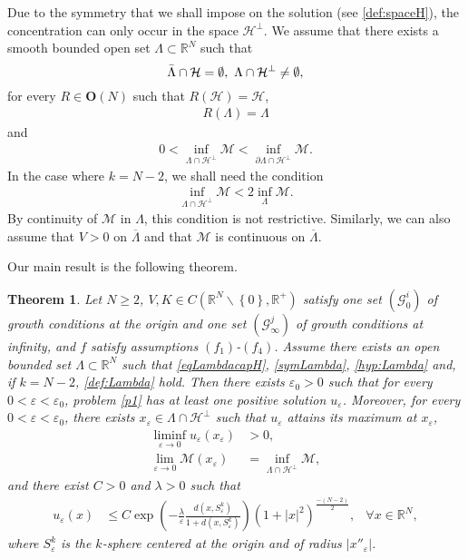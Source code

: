 \documentclass[a4paper]{amsart}
\newtheorem{theorem}{Theorem}
\begin{document}
Due to the symmetry that we shall impose on the solution (see \eqref{def:spaceH}), the
concentration can only occur in the space $\mathcal{H}^{\bot}$. We assume that there exists a smooth
bounded open set $\Lambda \subset {\mathbb{R}}^{N}$ such that  
\begin{equation}
\label{eqLambdacapH}
\Bar{\Lambda} \cap \mathcal{H} = \emptyset, \ \Lambda \cap \mathcal{H}^\perp \neq \emptyset,
\end{equation}
for every $R \in \mathbf{O}(N)$ such that $R(\mathcal{H})=\mathcal{H}$, 
\begin{align}
\label{symLambda}
  R(\Lambda)=\Lambda
\end{align}
and
\begin{align}\label{hyp:Lambda}
 0 < \inf_{\Lambda \cap \mathcal{H}^\perp}\mathcal{M} < \inf_{\partial \Lambda \cap \mathcal{H}^\perp}\mathcal{M}.
\end{align}
In the case where $k=N-2$, we shall need the condition
\begin{align}\label{def:Lambda}
 \inf_{\Lambda \cap \mathcal{H}^\perp}\mathcal{M} < 2 \inf_{\Lambda} \mathcal{M}.
\end{align}
By continuity of $\mathcal{M}$ in $\Lambda$, this condition is not restrictive.
Similarly, we can also assume that $V > 0$ on $\overline{\Lambda}$ and that $\mathcal{M}$ is continuous on $\overline{\Lambda}$.

\bigskip

Our main result is the following theorem.
\begin{theorem}\label{Th:main}
Let $N \geq 2$, $V, K \in C({\mathbb{R}}^N \backslash \left\{ 0 \right\},{\mathbb{R}}^+)$ satisfy one set $(\mathcal{G}_{0}^i)$ of growth conditions
at the origin and one set $(\mathcal{G}_{\infty}^j)$ of growth conditions at infinity, and $f$ satisfy assumptions $(f_1)$-$(f_4)$. 
Assume there exists an open
bounded set $\Lambda \subset {\mathbb{R}}^{N}$ such that \eqref{eqLambdacapH}, \eqref{symLambda}, \eqref{hyp:Lambda} and, if $k=N-2$, \eqref{def:Lambda} hold. Then there exists $\varepsilon_0 > 0$ such that for every $0 < \varepsilon <
\varepsilon_0$, problem \eqref{p1} has at least one positive solution $u_{\varepsilon}$. Moreover, for every $0 < \varepsilon <
\varepsilon_0$, there exists $x_{\varepsilon} \in \Lambda \cap \mathcal{H}^\perp$ such that $u_{\varepsilon}$ attains its maximum at $x_{\varepsilon}$,
\begin{align*}
 \liminf_{\varepsilon \to 0} u_{\varepsilon}(x_{\varepsilon}) &> 0, \\
 \lim_{\varepsilon \to 0} \mathcal{M} (x_{\varepsilon}) &= \inf_{\Lambda \cap \mathcal{H}^\perp} \mathcal{M},
\end{align*}
and there exist $C>0$ and $\lambda > 0$ such that
\begin{align*}
 u_{\varepsilon}(x) &\leq C \exp{\left( -\frac{\lambda}{\varepsilon} \frac{d(x,S^k_{\varepsilon})}{1+d(x,S^k_{\varepsilon})}\right) }
\left( 1+{\left| {x} \right|}^2 \right)^{\frac{-(N-2)}{2}}, &  \forall x \in {\mathbb{R}}^N,
\end{align*}
where $S^k_{\varepsilon}$ is the $k$-sphere centered at the origin and of radius ${\left| {x''_{\varepsilon}} \right|}$.
\end{theorem}
\end{document}
